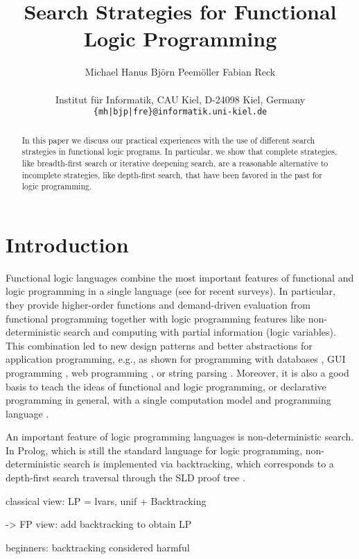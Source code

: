 \documentclass[english]{lni}
\author{
Michael Hanus
\quad
Bj{\"o}rn Peem{\"o}ller
\quad
Fabian Reck \\
\\
Institut f\"ur Informatik, CAU Kiel, D-24098 Kiel, Germany \\
\texttt{\{mh|bjp|fre\}@informatik.uni-kiel.de}
}
\title{Search Strategies for Functional Logic Programming}
\begin{document}
\maketitle

\begin{abstract}
In this paper we discuss our practical experiences
with the use of different search strategies
in functional logic programs.
In particular, we show that complete strategies,
like breadth-first search or iterative deepening search,
are a reasonable alternative to incomplete strategies, like depth-first
search, that have been favored in the past for logic programming.
\end{abstract}

\section{Introduction}

Functional logic languages combine the most important
features of functional and logic programming in a single language
(see \cite{AntoyHanus10CACM,Hanus07ICLP} for recent surveys).
In particular, they provide higher-order functions and demand-driven
evaluation from functional programming together with logic programming features
like non-deterministic search and computing with partial information
(logic variables).
This combination
led to new design patterns \cite{AntoyHanus02FLOPS,AntoyHanus11WFLP}
and better abstractions for application programming,
e.g., as shown for programming with databases
\cite{BrasselHanusMueller08PADL,Fischer05},
GUI programming \cite{Hanus00PADL},
web programming \cite{Hanus01PADL,Hanus06PPDP,HanusKoschnicke10PADL},
or string parsing \cite{CaballeroLopez99}.
Moreover, it is also a good basis
to teach the ideas of functional and logic programming,
or declarative programming in general,
with a single computation model and programming language
\cite{Hanus97DPLE}.

An important feature of logic programming languages
is non-deterministic search.
In Prolog, which is still the standard language for logic programming,
non-deterministic search is implemented via backtracking,
which corresponds to a depth-first search traversal
through the SLD proof tree \cite{Lloyd87}.


classical view: LP = lvars, unif + Backtracking

-> FP view: add backtracking to obtain LP

beginners: backtracking considered harmful
\end{document}
